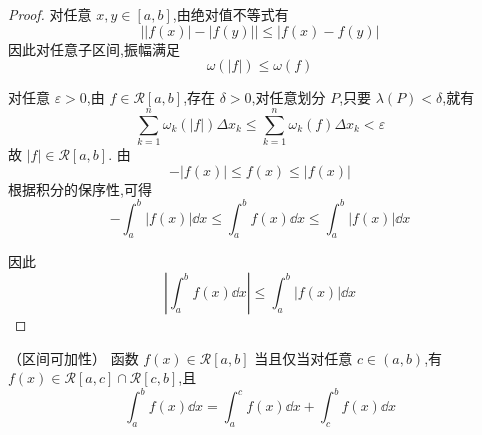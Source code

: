 \begin{proof}
	对任意 \( x,y \in [a,b] \),由绝对值不等式有
	\[
	\left| |f(x)| - |f(y)| \right| \leq |f(x) - f(y)|
	\]
	因此对任意子区间,振幅满足
	\[
	\omega(|f|) \leq \omega(f)
	\]
	
	对任意 \( \varepsilon>0 \),由 \( f \in \mathcal{R}[a,b] \),存在 \( \delta>0 \),对任意划分 \( P \),只要 \( \lambda(P)<\delta \),就有
	\[
	\sum_{k=1}^n \omega_k(|f|) \Delta x_k \leq \sum_{k=1}^n \omega_k(f) \Delta x_k < \varepsilon
	\]
	故 \( |f| \in \mathcal{R}[a,b] \).
	由
	\[
	-|f(x)| \leq f(x) \leq |f(x)|
	\]
	根据积分的保序性,可得
	\[
	-\int_a^b |f(x)| \dd x \leq \int_a^b f(x) \dd x \leq \int_a^b |f(x)| \dd x
	\]
	
	因此
	\[
	\left| \int_a^b f(x) \dd x \right| \leq \int_a^b |f(x)| \dd x
	\]
\end{proof}
\begin{proposition}（区间可加性）
	函数 \( f(x) \in \mathcal{R}[a,b] \) 当且仅当对任意 \( c \in (a,b) \),有 \( f(x) \in \mathcal{R}[a,c] \cap \mathcal{R}[c,b] \),且
	\[
	\int_a^b f(x)\dd x = \int_a^c f(x)\dd x + \int_c^b f(x)\dd x \tag{1}
	\]
\end{proposition}
